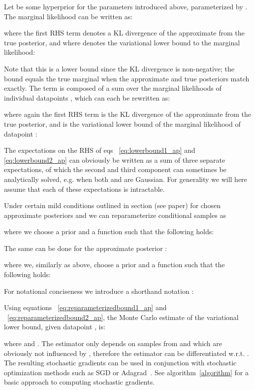 \documentclass{article} \usepackage{nips13submit_e,times}
\theoremstyle{definition}
\theoremstyle{definition}
\begin{document}
Let   be some hyperprior for the parameters introduced above, parameterized by . The marginal likelihood can be written as:

where the first RHS term denotes a KL divergence of the approximate from the true posterior, and where  denotes the variational lower bound to the marginal likelihood:

Note that this is a lower bound since the KL divergence is non-negative; the bound equals the true marginal when the approximate and true posteriors match exactly.
The term  is composed of a sum over the marginal likelihoods of individual datapoints , which can each be rewritten as:

where again the first RHS term is the KL divergence of the approximate from the true posterior, and  is the variational lower bound of the marginal likelihood of datapoint :




The expectations on the RHS of eqs ~\eqref{eq:lowerbound1_ap} and \eqref{eq:lowerbound2_ap} can obviously be written as a sum of three separate expectations, of which the second and third component can sometimes be analytically solved, e.g. when both  and  are Gaussian. For generality we will here assume that each of these expectations is intractable.

Under certain mild conditions outlined in section (see paper) for chosen approximate posteriors  and  we can reparameterize conditional samples  as

where we choose a prior  and a function  such that the following holds:

The same can be done for the approximate posterior :

where we, similarly as above, choose a prior  and a function  such that the following holds:


For notational conciseness we introduce a shorthand notation :

Using equations ~\eqref{eq:reparameterizedbound1_ap} and ~\eqref{eq:reparameterizedbound2_ap}, the Monte Carlo estimate of the variational lower bound, given datapoint , is:

where  and . 
The estimator only depends on samples from  and  which are obviously not influenced by , therefore the estimator can be differentiated w.r.t. . The resulting stochastic gradients can be used in conjunction with stochastic optimization methods such as SGD or Adagrad~\cite{duchi2010adaptive}. See algorithm~\ref{algorithm} for a basic approach to computing stochastic gradients.
\end{document}

